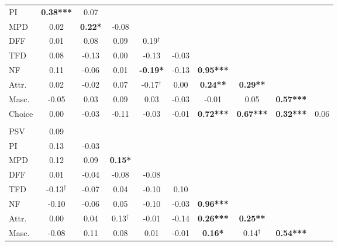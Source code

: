 \documentclass[
  bookmarksnumbered]{article}
\begin{document}
\begin{table}[H]
{\begin{threeparttable}
\begin{tabular}[t]{lccccccccc}
\hspace{1em}PI & \textbf{0.38***} & 0.07 &  &  &  &  &  &  & \\
\hspace{1em}MPD & 0.02 & \textbf{0.22*} & -0.08 &  &  &  &  &  & \\
\hspace{1em}DFF & 0.01 & 0.08 & 0.09 & 0.19$^{\dagger}$ &  &  &  &  & \\
\hspace{1em}TFD & 0.08 & -0.13 & 0.00 & -0.13 & -0.03 &  &  &  & \\
\hspace{1em}NF & 0.11 & -0.06 & 0.01 & \textbf{-0.19*} & -0.13 & \textbf{0.95***} &  &  & \\
\hspace{1em}Attr. & 0.02 & -0.02 & 0.07 & -0.17$^{\dagger}$ & 0.00 & \textbf{0.24**} & \textbf{0.29**} &  & \\
\hspace{1em}Masc. & -0.05 & 0.03 & 0.09 & 0.03 & -0.03 & -0.01 & 0.05 & \textbf{0.57***} & \\
\hspace{1em}Choice & 0.00 & -0.03 & -0.11 & -0.03 & -0.01 & \textbf{0.72***} & \textbf{0.67***} & \textbf{0.32***} & 0.06\\
\addlinespace[0.3em]
\hline
\multicolumn{10}{l}{\textbf{High condition, short-term relationship}}\\
\hline
\hspace{1em}PSV & 0.09 &  &  &  &  &  &  &  \vphantom{1} & \\
\hspace{1em}PI & 0.13 & -0.03 &  &  &  &  &  &  \vphantom{1} & \\
\hspace{1em}MPD & 0.12 & 0.09 & \textbf{0.15*} &  &  &  &  &  \vphantom{1} & \\
\hspace{1em}DFF & 0.01 & -0.04 & -0.08 & -0.08 &  &  &  &  & \\
\hspace{1em}TFD & -0.13$^{\dagger}$ & -0.07 & 0.04 & -0.10 & 0.10 &  &  &  & \\
\hspace{1em}NF & -0.10 & -0.06 & 0.05 & -0.10 & -0.03 & \textbf{0.96***} &  &  & \\
\hspace{1em}Attr. & 0.00 & 0.04 & 0.13$^{\dagger}$ & -0.01 & -0.14 & \textbf{0.26***} & \textbf{0.25**} &  & \\
\hspace{1em}Masc. & -0.08 & 0.11 & 0.08 & 0.01 & -0.01 & \textbf{0.16*} & 0.14$^{\dagger}$ & \textbf{0.54***} & \\

\end{tabular}
\end{threeparttable}}
\end{table}
\end{document}
